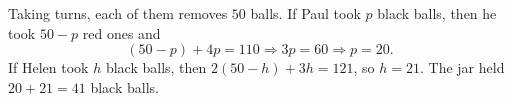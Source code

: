 Taking turns, each of them removes $50$ balls. If Paul took $p$ black balls, then he took $50-p$ red ones and
\[
(50-p)+4p=110\Rightarrow 3p=60\Rightarrow p=20 .
\]
If Helen took $h$ black balls, then $2(50-h)+3h=121$, so $h=21$. The jar held $20+21=\boxed{41}$ black balls.
